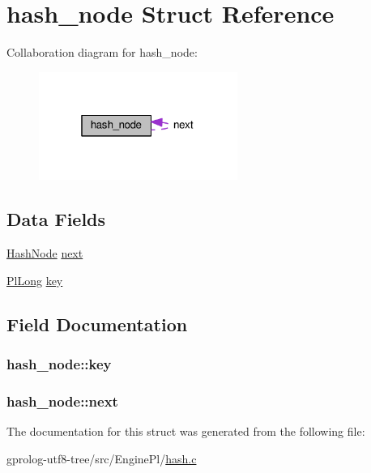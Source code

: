 \hypertarget{structhash__node}{}\section{hash\+\_\+node Struct Reference}
\label{structhash__node}


Collaboration diagram for hash\+\_\+node\+:\nopagebreak
\begin{figure}[H]
\begin{center}
\leavevmode
\includegraphics[width=184pt]{structhash__node__coll__graph}
\end{center}
\end{figure}
\subsection*{Data Fields}
\begin{DoxyCompactItemize}
\item 
\hyperlink{hash_8c_af2f765d2edcbbb62c54ee3359891ad22}{Hash\+Node} \hyperlink{structhash__node_a37ad6e543029e7eef401f8be7a984689}{next}
\item 
\hyperlink{gprolog_8h_a4d005b136d7fb28537eb1815f7868b63}{Pl\+Long} \hyperlink{structhash__node_aa9c0ed0ab7bc110696244024900e9419}{key}
\end{DoxyCompactItemize}


\subsection{Field Documentation}
\subsubsection[{\texorpdfstring{key}{key}}]{ hash\+\_\+node\+::key}\hypertarget{structhash__node_aa9c0ed0ab7bc110696244024900e9419}{}\label{structhash__node_aa9c0ed0ab7bc110696244024900e9419}
\subsubsection[{\texorpdfstring{next}{next}}]{ hash\+\_\+node\+::next}\hypertarget{structhash__node_a37ad6e543029e7eef401f8be7a984689}{}\label{structhash__node_a37ad6e543029e7eef401f8be7a984689}


The documentation for this struct was generated from the following file\+:\begin{DoxyCompactItemize}
\item 
gprolog-\/utf8-\/tree/src/\+Engine\+Pl/\hyperlink{hash_8c}{hash.\+c}\end{DoxyCompactItemize}
